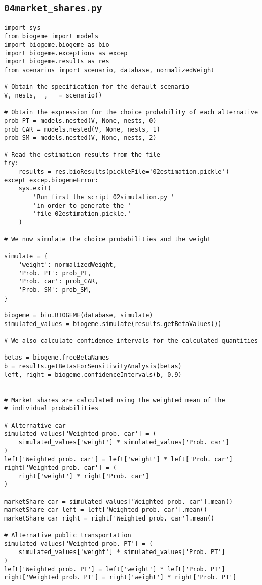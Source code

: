 \documentclass[12pt,a4paper]{article}
\begin{document}
\subsection{\lstinline$04market_shares.py$}\label{sec:04market_shares}
\begin{lstlisting}[style=numbers]
import sys
from biogeme import models
import biogeme.biogeme as bio
import biogeme.exceptions as excep
import biogeme.results as res
from scenarios import scenario, database, normalizedWeight

# Obtain the specification for the default scenario
V, nests, _, _ = scenario()

# Obtain the expression for the choice probability of each alternative
prob_PT = models.nested(V, None, nests, 0)
prob_CAR = models.nested(V, None, nests, 1)
prob_SM = models.nested(V, None, nests, 2)

# Read the estimation results from the file
try:
    results = res.bioResults(pickleFile='02estimation.pickle')
except excep.biogemeError:
    sys.exit(
        'Run first the script 02simulation.py '
        'in order to generate the '
        'file 02estimation.pickle.'
    )

# We now simulate the choice probabilities and the weight

simulate = {
    'weight': normalizedWeight,
    'Prob. PT': prob_PT,
    'Prob. car': prob_CAR,
    'Prob. SM': prob_SM,
}

biogeme = bio.BIOGEME(database, simulate)
simulated_values = biogeme.simulate(results.getBetaValues())

# We also calculate confidence intervals for the calculated quantities

betas = biogeme.freeBetaNames
b = results.getBetasForSensitivityAnalysis(betas)
left, right = biogeme.confidenceIntervals(b, 0.9)


# Market shares are calculated using the weighted mean of the
# individual probabilities

# Alternative car
simulated_values['Weighted prob. car'] = (
    simulated_values['weight'] * simulated_values['Prob. car']
)
left['Weighted prob. car'] = left['weight'] * left['Prob. car']
right['Weighted prob. car'] = (
    right['weight'] * right['Prob. car']
)

marketShare_car = simulated_values['Weighted prob. car'].mean()
marketShare_car_left = left['Weighted prob. car'].mean()
marketShare_car_right = right['Weighted prob. car'].mean()

# Alternative public transportation
simulated_values['Weighted prob. PT'] = (
    simulated_values['weight'] * simulated_values['Prob. PT']
)
left['Weighted prob. PT'] = left['weight'] * left['Prob. PT']
right['Weighted prob. PT'] = right['weight'] * right['Prob. PT']


\end{lstlisting}
\end{document}
